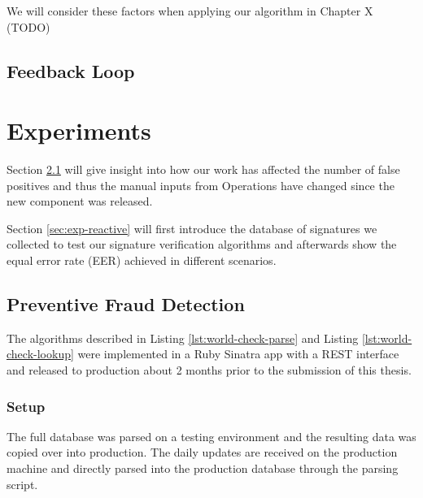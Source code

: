 \documentclass[a4paper, oneside]{csthesis}
\begin{document}
We will consider these factors when applying our algorithm in Chapter X (TODO)


\section{Feedback Loop}




















\chapter{Experiments}
\label{chp:experiments}



Section \ref{sec:exp-preventive} will give insight into how our work has affected the number of false positives and thus the manual inputs from Operations have changed since the new component was released.

Section \ref{sec:exp-reactive} will first introduce the database of signatures we collected to test our signature verification algorithms and afterwards show the equal error rate (EER) achieved in different scenarios.


\section{Preventive Fraud Detection}
\label{sec:exp-preventive}

The algorithms described in Listing \ref{lst:world-check-parse} and Listing \ref{lst:world-check-lookup} were implemented in a Ruby Sinatra app with a REST interface and released to production about 2 months prior to the submission of this thesis.

\subsection{Setup}

The full database was parsed on a testing environment and the resulting data was copied over into production. The daily updates are received on the production machine and directly parsed into the production database through the parsing script.
\end{document}
